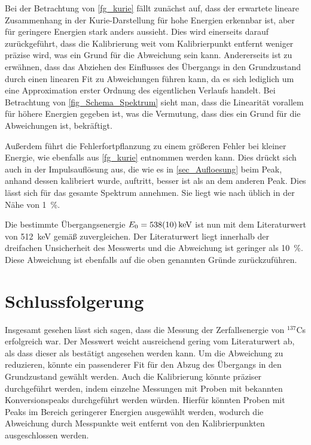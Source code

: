 \documentclass[
	a4paper,
	12pt,
	pagesize,
	ngerman
]{scrartcl}
\begin{document}
	Bei der Betrachtung von \cref{fg_kurie} fällt zunächst auf, dass der erwartete lineare Zusammenhang in der Kurie-Darstellung für hohe Energien erkennbar ist, aber für geringere Energien stark anders aussieht.
	Dies wird einerseits darauf zurückgeführt, dass die Kalibrierung weit vom Kalibrierpunkt entfernt weniger präzise wird, was ein Grund für die Abweichung sein kann.
	Andererseits ist zu erwähnen, dass das Abziehen des Einflusses des Übergangs in den Grundzustand durch einen linearen Fit zu Abweichungen führen kann, da es sich lediglich um eine Approximation erster Ordnung des eigentlichen Verlaufs handelt.
	Bei Betrachtung von \cref{fig_Schema_Spektrum} sieht man, dass die Linearität vorallem für höhere Energien gegeben ist, was die Vermutung, dass dies ein Grund für die Abweichungen ist, bekräftigt.

	Außerdem führt die Fehlerfortpflanzung zu einem größeren Fehler bei kleiner Energie, wie ebenfalls aus \cref{fg_kurie} entnommen werden kann.
	Dies drückt sich auch in der Impulsauflösung aus, die wie es in \cref{sec_Aufloesung} beim Peak, anhand dessen kalibriert wurde, auftritt, besser ist als an dem anderen Peak.
	Dies lässt sich für das gesamte Spektrum annehmen.
	Sie liegt wie nach \cite{Anleitung} üblich in der Nähe von \SI{1}{\percent}.

	Die bestimmte Übergangsenergie $E_0=\SI{538+-10}{keV}$ ist nun mit dem Literaturwert von \SI{512}{keV} gemäß \cite{Leifi} zuvergleichen.
	Der Literaturwert liegt innerhalb der dreifachen Unsicherheit des Messwerts und die Abweichung ist geringer als \SI{10}{\percent}.
	Diese Abweichung ist ebenfalls auf die oben genannten Gründe zurückzuführen.



	\section{Schlussfolgerung}
	Insgesamt gesehen lässt sich sagen, dass die Messung der Zerfallsenergie von $^{137}$Cs erfolgreich war.
	Der Messwert weicht ausreichend gering vom Literaturwert ab, als dass dieser als bestätigt angesehen werden kann.
	Um die Abweichung zu reduzieren, könnte ein passenderer Fit für den Abzug des Übergangs in den Grundzustand gewählt werden.
	Auch die Kalibrierung könnte präziser durchgeführt werden, indem einzelne Messungen mit Proben mit bekannten Konversionspeaks durchgeführt werden würden.
	Hierfür könnten Proben mit Peaks im Bereich geringerer Energien ausgewählt werden, wodurch die Abweichung durch Messpunkte weit entfernt von den Kalibrierpunkten ausgeschlossen werden.

	\printbibliography
\end{document}
